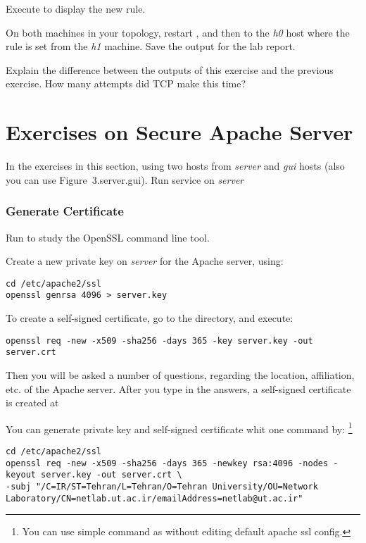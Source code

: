 \documentclass{../UTNetLab}
\begin{document}
Execute  to display the new rule.

On both machines in your topology, restart , and then  to the \textit{h0} host where the rule is set from the \textit{h1} machine.
Save the  output for the lab report.

\begin{report}
    \item Explain the difference between the  outputs of this exercise and the previous exercise.
    How many attempts did {TCP} make this time?
\end{report}

\part{Exercises on Secure Apache Server}
In the exercises in this section, using two hosts from \textit{server} and \textit{gui} hosts (also you can use {Figure~3.server.gui}).
Run  service on \textit{server}

\section{Generate Certificate}
Run  to study the OpenSSL command line tool.

Create a new private key on \textit{server} for the Apache server, using:
\begin{lstlisting}[emph={server,key},morekeywords={[2]genrsa}]
cd /etc/apache2/ssl
openssl genrsa 4096 > server.key
    \end{lstlisting}
To create a self-signed certificate, go to the  directory, and execute:
\begin{lstlisting}[emph={server,key,crt},morekeywords={[2]req}]
openssl req -new -x509 -sha256 -days 365 -key server.key -out server.crt
    \end{lstlisting}
Then you will be asked a number of questions, regarding the location, affiliation, etc.
of the Apache server.
After you type in the answers, a self-signed certificate is created at 

You can generate private key and self-signed certificate whit one command by:
\footnote{You can use simple command as  without editing default apache ssl config.}
\begin{lstlisting}[emph={server,key,crt},morekeywords={[2]req},escapechar={}]
cd /etc/apache2/ssl
openssl req -new -x509 -sha256 -days 365 -newkey rsa:4096 -nodes -keyout server.key -out server.crt \
-subj "/C=IR/ST=Tehran/L=Tehran/O=Tehran University/OU=Network Laboratory/CN=netlab.ut.ac.ir/emailAddress=netlab@ut.ac.ir"
    \end{lstlisting}
\end{document}

